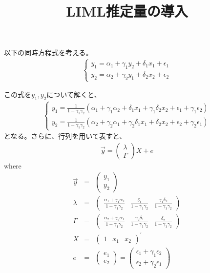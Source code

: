 \documentclass[a4paper, 12pt]{ltjsarticle}
\title{LIML推定量の導入}
\author{}
\date{}
\begin{document}
\maketitle
以下の同時方程式を考える。
\begin{align}
  \begin{cases}
    y_1 = \alpha_1 + \gamma_1 y_2 + \delta_1 x_1 + \epsilon_1 \\
    y_2 = \alpha_2 + \gamma_2 y_1 + \delta_2 x_2 + \epsilon_2
  \end{cases}
\end{align}

この式を$y_1, y_2$について解くと、
\begin{align}
  \begin{cases}
    y_1 = \frac{1}{1 - \gamma_1 \gamma_2} (\alpha_1 + \gamma_1 \alpha_2 + \delta_1 x_1 + \gamma_1 \delta_2 x_2 + \epsilon_1 + \gamma_1 \epsilon_2) \\
    y_2 = \frac{1}{1 - \gamma_1 \gamma_2} (\alpha_2 + \gamma_2 \alpha_1 + \gamma_2 \delta_1 x_1 + \delta_2 x_2 + \epsilon_2 + \gamma_2 \epsilon_1)
  \end{cases}
\end{align}
となる。さらに、行列を用いて表すと、
\begin{align}
  \vec{y}=\begin{pmatrix}
    \lambda\\
    \Gamma
  \end{pmatrix}X + e
\end{align}
where
\begin{eqnarray*}
  \vec{y}&=&\begin{pmatrix}
    y_1\\
    y_2
  \end{pmatrix}\\
  \lambda&=&\begin{pmatrix}
    \frac{\alpha_1+\gamma_1 \alpha_2}{1-\gamma_1 \gamma_2}&
    \frac{\delta_1}{1-\gamma_1 \gamma_2} &
    \frac{\gamma_1 \delta_2}{1-\gamma_1 \gamma_2}
  \end{pmatrix}\\
  \Gamma&=&\begin{pmatrix}
    \frac{\alpha_2+\gamma_2 \alpha_1}{1-\gamma_1 \gamma_2}&
    \frac{\gamma_2 \delta_1}{1-\gamma_1 \gamma_2} &
    \frac{\delta_2}{1-\gamma_1 \gamma_2}
  \end{pmatrix}\\
  X&=&\begin{pmatrix}
    1&x_1&x_2
  \end{pmatrix}^{\prime}\\
  e&=&\begin{pmatrix}
    e_1\\
    e_2
  \end{pmatrix}= \begin{pmatrix}
    \epsilon_1 + \gamma_1 \epsilon_2\\
    \epsilon_2 + \gamma_2 \epsilon_1
  \end{pmatrix}
\end{eqnarray*}
\end{document}
